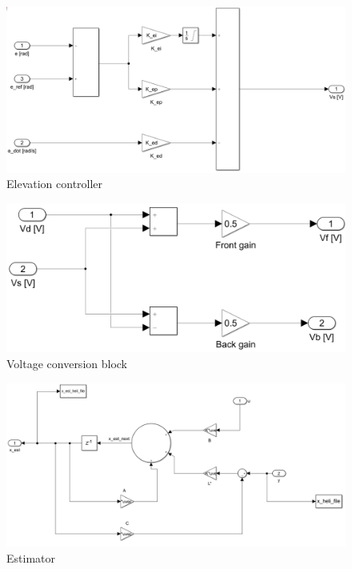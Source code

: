 \begin{figure}
    \centering
    \includegraphics[scale=0.2]{fig/simulink/elevation_controller.png}
    \caption{Elevation controller}
    \label{fig:simulink_elev_contr}
\end{figure}

\begin{figure}
    \centering
    \includegraphics[scale=0.2]{fig/simulink/Vd_Vs_block.png}
    \caption{Voltage conversion block}
    \label{fig:simulink_Vd_Vs_block}
\end{figure}

\begin{figure}
    \centering
    \includegraphics[scale=0.2]{fig/simulink/estimator.png}
    \caption{Estimator}
    \label{fig:simulink_estimator}
\end{figure}